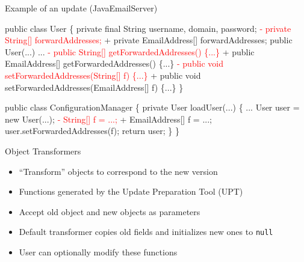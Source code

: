 \begin{frame}[fragile,shrink=5]{Example of an update (JavaEmailServer)}%
\newcommand{\removed}[1]{\textcolor{red}{- #1}}
\newcommand{\addedxx}[1]{\textcolor{OliveGreen}{+ #1}}
\begin{\ExampleCodeSize}
\begin{semiverbatim}
  public class User \{
    private final String username, domain, password;
\removed{  private String[] forwardAddresses;}
\addedxx{  private EmailAddress[] forwardAddresses;}
    public User(...) {...}
\removed{  public String[] getForwardedAddresses() \{...\}}
\addedxx{  public EmailAddress[] getForwardedAddresses() \{...\}}
\removed{  public void setForwardedAddresses(String[] f) \{...\}}
\addedxx{  public void setForwardedAddresses(EmailAddress[] f) \{...\}}
  \}

  public class ConfigurationManager \{
    private User loadUser(...) \{
       ...
       User user = new User(...);
\removed{     String[] f = ...;}
\addedxx{     EmailAddress[] f = ...;}
       user.setForwardedAddresses(f);
       return user;
    \}
  \}
\end{semiverbatim}
\end{\ExampleCodeSize}
\end{frame}

\begin{frame}{Object Transformers}%
\begin{itemize}
\item ``Transform'' objects to correspond to the new version
\item Functions generated by the Update Preparation Tool (UPT)
\item Accept old object and new objects as parameters
\item Default transformer copies old fields and initializes new ones to
\texttt{null}
\item User can optionally modify these functions
\end{itemize}
\end{frame}

